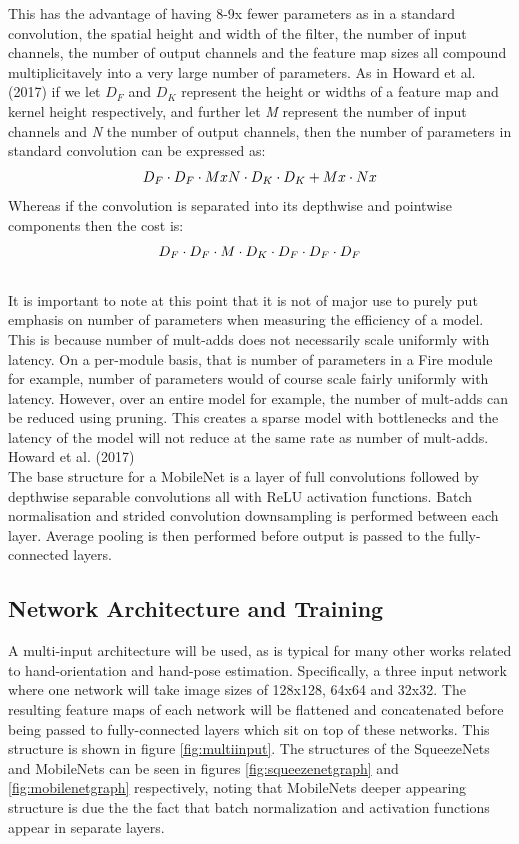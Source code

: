 \documentclass{article}
\begin{document}
This has the advantage of having 8-9x fewer parameters as in a standard convolution, the spatial height and width of the filter, the number of input channels, the number of output channels and the feature map sizes all compound multiplicitavely into a very large number of parameters. As in Howard et al. (2017) if we let \emph{$D_{F}$} and \emph{$D_{K}$} represent the height or widths of a feature map and kernel height respectively, and further let \emph{M} represent the number of input channels and \emph{N} the number of output channels, then the number of parameters in standard convolution can be expressed as: \[\emph{$D_{F}$} \cdot \emph{$D_{F}$} \cdot M x N \cdot \emph{$D_{K}$} \cdot \emph{$D_{K}$} + M x \cdot N x \] Whereas if the convolution is separated into its depthwise and pointwise components then the cost is: \[\emph{$D_{F}$} \cdot \emph{$D_{F}$} \cdot M \cdot \emph{$D_{K}$} \cdot \emph{$D_{F}$} \cdot \emph{$D_{F}$} \cdot \emph{$D_{F}$}\]\\

It is important to note at this point that it is not of major use to purely put emphasis on number of parameters when measuring the efficiency of a model. This is because number of mult-adds does not necessarily scale uniformly with latency. On a per-module basis, that is number of parameters in a Fire module for example, number of parameters would of course scale fairly uniformly with latency. However, over an entire model for example, the number of mult-adds can be reduced using pruning. This creates a sparse model with bottlenecks and the latency of the model will not reduce at the same rate as number of mult-adds. Howard et al. (2017) \\

The base structure for a MobileNet is a layer of full convolutions followed by depthwise separable convolutions all with ReLU activation functions. Batch normalisation and strided convolution downsampling is performed between each layer. Average pooling is then performed before output is passed to the fully-connected layers.\\


\subsection{Network Architecture and Training}
A multi-input architecture will be used, as is typical for many other works related to hand-orientation and hand-pose estimation. Specifically, a three input network where one network will take image sizes of 128x128, 64x64 and 32x32. The resulting feature maps of each network will be flattened and concatenated before being passed to fully-connected layers which sit on top of these networks. This structure is shown in figure \ref{fig:multiinput}. The structures of the SqueezeNets and MobileNets can be seen in figures \ref{fig:squeezenetgraph} and \ref{fig:mobilenetgraph} respectively, noting that MobileNets deeper appearing structure is due the the fact that batch normalization and activation functions appear in separate layers.\\
\end{document}
